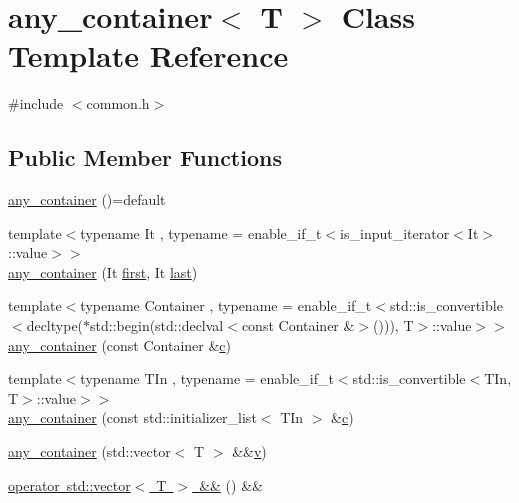 \hypertarget{classany__container}{}\section{any\+\_\+container$<$ T $>$ Class Template Reference}
\label{classany__container}


{\ttfamily \#include $<$common.\+h$>$}

\subsection*{Public Member Functions}
\begin{DoxyCompactItemize}
\item 
\mbox{\hyperlink{classany__container_ada7ea5cc76b0faf62d22d9bd3deca147}{any\+\_\+container}} ()=default
\item 
{\footnotesize template$<$typename It , typename  = enable\+\_\+if\+\_\+t$<$is\+\_\+input\+\_\+iterator$<$\+It$>$\+::value$>$$>$ }\\\mbox{\hyperlink{classany__container_a16c36f2f2714692d2112d66cf539f882}{any\+\_\+container}} (It \mbox{\hyperlink{_s_d_l__opengl__glext_8h_ada771a798be00a696d20928c9a3371e7}{first}}, It \mbox{\hyperlink{detail_2common_8h_a98cc70241f124ef088fa2d7d716166fd}{last}})
\item 
{\footnotesize template$<$typename Container , typename  = enable\+\_\+if\+\_\+t$<$std\+::is\+\_\+convertible$<$decltype($\ast$std\+::begin(std\+::declval$<$const Container \&$>$())), T$>$\+::value$>$$>$ }\\\mbox{\hyperlink{classany__container_a683c6b51acd3f23aa48505b2bca83629}{any\+\_\+container}} (const Container \&\mbox{\hyperlink{_s_d_l__opengl__glext_8h_a1f2d7f8147412c43ba2303a56f97ee73}{c}})
\item 
{\footnotesize template$<$typename T\+In , typename  = enable\+\_\+if\+\_\+t$<$std\+::is\+\_\+convertible$<$\+T\+In, T$>$\+::value$>$$>$ }\\\mbox{\hyperlink{classany__container_a7bc3471a016f7dafe3878fa66497ad26}{any\+\_\+container}} (const std\+::initializer\+\_\+list$<$ T\+In $>$ \&\mbox{\hyperlink{_s_d_l__opengl__glext_8h_a1f2d7f8147412c43ba2303a56f97ee73}{c}})
\item 
\mbox{\hyperlink{classany__container_a6a530db0c5ae047d9d7fcea35426b278}{any\+\_\+container}} (std\+::vector$<$ T $>$ \&\&\mbox{\hyperlink{_s_d_l__opengl_8h_a10a82eabcb59d2fcd74acee063775f90}{v}})
\item 
\mbox{\hyperlink{classany__container_afd688b631f9201494f55e82e6ff4b099}{operator std\+::vector$<$ T $>$ \&\&}} () \&\&

\end{DoxyCompactItemize}
